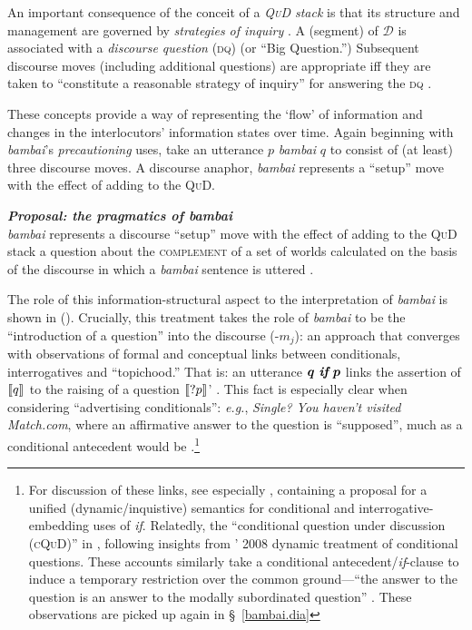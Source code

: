 \noindent An important consequence of the conceit of a \textit{\textsc{QuD} stack} is that its structure and management are governed by \textit{strategies of inquiry} \citep{Roberts1998,Roberts2004,Roberts2012}. A (segment) of $ \mathcal D $ is associated with a \textit{discourse question} \textsc{(dq)} (or ``Big Question.'') Subsequent discourse moves (including additional questions) are appropriate iff they are taken to ``constitute a reasonable strategy of inquiry'' for answering the \textsc{dq} \citep*{Simons2017}.

These concepts provide a way of representing the `flow' of information and changes in the interlocutors' information states over time. Again beginning with \textit{bambai}'s \textit{precautioning} uses, take an utterance $ p $ \textit{bambai} $ q $ to consist of (at least) three discourse moves. A discourse anaphor, \textit{bambai} represents a ``setup'' move with the effect of adding to the \textsc{QuD}. 

\ex \textbf{\emph{Proposal: the pragmatics of \emph{bambai}}}\\
\textit{bambai} represents a discourse ``setup'' move with the effect of adding to the \textsc{QuD} stack a question about the \textsc{complement} of a set of worlds calculated on the basis of the discourse in which a \textit{bambai} sentence is uttered	.\xe

\noindent The role of this information-structural aspect to the interpretation of \textit{bambai} is shown in (). Crucially, this treatment takes the role of \textit{bambai} to be the ``introduction of a question'' into the discourse (-$m_j$): an approach that converges with observations of formal and conceptual links between conditionals, interrogatives and ``topichood.'' That is: an utterance $\boldsymbol{ q\textit{ \textbf{if} }p }$ links the assertion of $ \llbracket{q}\rrbracket^{} $ to the raising of a question $\llbracket{ ?p}\rrbracket^{} $' \citep[36]{Starr2010}. This fact is especially clear when considering ``advertising conditionals'': \textit{e.g.}, \textit{Single? You haven't visited Match.com}, where an affirmative answer to the question is ``supposed'', much as a conditional antecedent would be \citep[4]{Starr2014a}.\footnote{For discussion of these links, see especially \citet{Starr2010,Starr2011,Starr2014a}, containing a proposal for a unified (dynamic/inquistive) semantics for conditional and interrogative-embedding uses of \textit{if}. Relatedly, the ``conditional question under discussion (\textsc{cQuD})'' in \citealp{Ippolito2013a}, following insights from \citeauthor{Isaacs2008}' 2008 dynamic treatment of conditional questions. These accounts similarly take a conditional antecedent/\textit{if}-clause to induce a temporary restriction over the common ground---``the answer to the question is an answer to the modally subordinated question'' \citep[200]{Ippolito2013a}. These observations are picked up again in \S~\ref{bambai.dia}}

